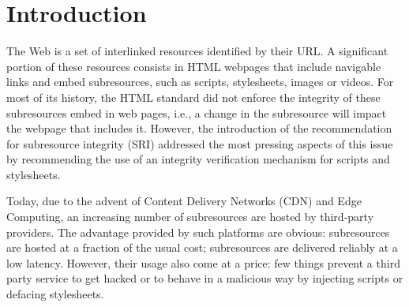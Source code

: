 \documentclass[sigconf,table]{acmart}
\begin{document}



\def\LatestCCNbURLS{\num{3000000000}\xspace}
\def\LatestCCSize{\num{50}~TB\xspace}
\def\LatestCCDate{2019-08\xspace}
\def\EarliestCCDate{2011-01\xspace}
\def\lastvisited{last visited}
\def\JS{JavaScript\xspace}
\def\BS{beautifulsoup\xspace}
\def\CodeURL{\url{https://link.to.the.code}\xspace}
\def\CCSnapshotN{7\xspace}
\def\CCSnapshotDates{2016-06, 2017-03, 2017-09, 2018-03, 2018-09, 2019-03, and 2019-08\xspace}
\def\CCSnapshotEarliest{2016-06\xspace}
\def\CCSnapshotLatest{2019-08\xspace}

\def\CC{\textit{CC}\xspace}
\def\CCSRI{\textit{CC-SRI}\xspace}
\def\Cisco{\textit{Cisco}}
\def\TopK{\textit{Top1k}}
\def\TopM{\textit{Top1m}}









\maketitle

\sloppy

\section{Introduction} \label{sec:introduction}

The Web is a set of interlinked resources identified by their URL.
A significant portion of these resources consists in HTML webpages that include navigable links and embed subresources, such as scripts, stylesheets, images or videos.
For most of its history, the HTML standard did not enforce the integrity of these subresources embed in web pages, i.e., a change in the subresource will impact the webpage that includes it.
However, the introduction of the recommendation for subresource integrity (SRI) addressed the most pressing aspects of this issue by recommending the use of an integrity verification mechanism for scripts and stylesheets.

Today, due to the advent of Content Delivery Networks (CDN) and Edge Computing, an increasing number of subresources are hosted by third-party providers.
The advantage provided by such platforms are obvious: subresources are hosted at a fraction of the usual cost; subresources are delivered reliably at a low latency.
However, their usage also come at a price: few things prevent a third party service to get hacked or to behave in a malicious way by injecting scripts or defacing stylesheets.
\end{document}
